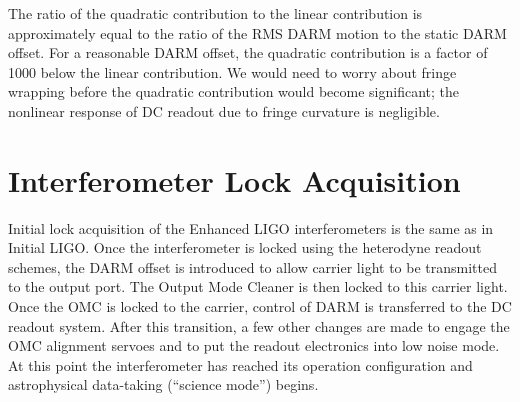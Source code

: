 The ratio of the quadratic contribution to the linear contribution is
approximately equal to the ratio of the RMS DARM motion to the static
DARM offset.  For a reasonable DARM offset, the quadratic contribution
is a factor of 1000 below the linear contribution.  We would need to
worry about fringe wrapping before the quadratic contribution would
become significant; the nonlinear response of DC readout due to fringe
curvature is negligible.

\section{Interferometer Lock Acquisition}

Initial lock acquisition of the Enhanced LIGO interferometers is the
same as in Initial LIGO\cite{Evans2002Lock}. Once the interferometer
is locked using the heterodyne readout schemes, the DARM offset is
introduced to allow carrier light to be transmitted to the output
port. The Output Mode Cleaner is then locked to this carrier
light. Once the OMC is locked to the carrier, control of DARM is
transferred to the DC readout system.  After this transition, a few
other changes are made to engage the OMC alignment servoes and to put
the readout electronics into low noise mode. At this point the
interferometer has reached its operation configuration and
astrophysical data-taking ({}``science mode'') begins.


